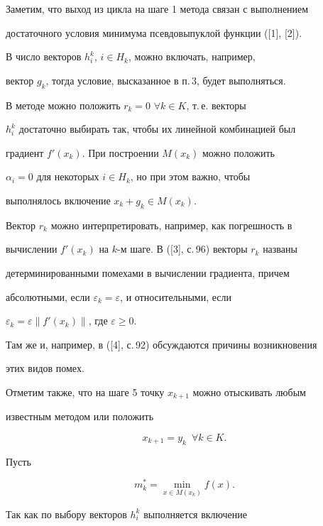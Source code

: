 Заметим, что выход из цикла на шаге 1 метода связан с выполнением


достаточного условия минимума псевдовыпуклой функции ([1], [2]).


В число векторов $h^{k}_i$, $i\in H_k$, можно включать, например,


вектор $g_k$, тогда условие, высказанное в п.\,3, будет выполняться.


В методе можно положить $r_k=0$ $\forall k\in K$, т.\,е.{} векторы


$h^k_i$ достаточно выбирать так, чтобы их линейной комбинацией был


градиент $f'(x_k)$. При построении $M(x_k)$ можно положить


$\alpha_i=0$ для некоторых $i\in H_k$, но при этом важно, чтобы 


выполнялось включение $x_k+g_k\in M(x_k)$.





Вектор $r_k$ можно интерпретировать, например, как погрешность в 


вычислении $f'(x_k)$ на $k$-м шаге. В ([3], с.\,96) векторы $r_k$ названы


детерминированными помехами в вычислении градиента, причем 


абсолютными, если $\varepsilon_k=\varepsilon$, и относительными, если


$\varepsilon_k=\varepsilon\|f'(x_k)\|$, где $\varepsilon \geq 0$.


Там же и, например, в ([4], с.\,92) обсуждаются причины возникновения


этих видов помех.





Отметим также, что на шаге 5 точку $x_{k+1}$ можно отыскивать любым


известным методом или положить


\begin{equation}


x_{k+1}=y_k\ \; \forall k\in K.


\end{equation}





Пусть


$$


m^*_k=\min_{x\in M(x_k)}f(x).


$$


Так как по выбору векторов $h^{k}_i$ выполняется включение


